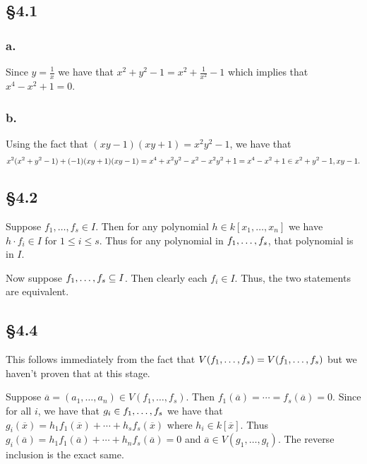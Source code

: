 \documentclass[letterpaper]{article}
\begin{document}
\subsection*{\S 4.1}

\subsubsection*{a.}

Since $y = \frac{1}{x}$ we have that $x^{2} + y^{2} - 1 = x^{2} + \frac{1}{x^{2}} - 1$ which implies that $x^{4} - x^{2} + 1 = 0$.

\subsubsection*{b.}

Using the fact that $(xy - 1)(xy + 1) = x^{2}y^{2} - 1$, we have that
\[
  x^{2}(x^{2} + y^{2} - 1) + (-1)(xy + 1)(xy - 1) = x^{4} + x^{2}y^{2} - x^{2} - x^{2}y^{2} + 1 = x^{4} - x^{2} + 1 \in \ideal{x^{2} + y^{2} - 1, xy - 1}.
\]

\subsection*{\S 4.2}

Suppose $f_{1}, \ldots, f_{s} \in I$. Then for any polynomial $h \in k[x_{1}, \ldots, x_{n}]$ we have $h \cdot f_{i} \in I$ for $1 \leq i \leq s$. Thus for any polynomial in $\gen{ f_{1}, \ldots, f_{s} }$, that polynomial is in $I$.

Now suppose $\gen{ f_{1}, \ldots, f_{s} } \subseteq I$. Then clearly each $f_{i} \in I$.
Thus, the two statements are equivalent.

\subsection*{\S 4.4}

This follows immediately from the fact that $V(f_{1}, \ldots, f_{s}) = V(\ideal{f_{1}, \ldots, f_{s}})$ but we haven't proven that at this stage.

Suppose $\overline{a} = (a_{1}, \ldots, a_{n}) \in V(f_{1}, \ldots, f_{s})$.
Then $f_{1}(\overline{a}) = \cdots = f_{s}(\overline{a}) = 0$.
Since for all $i$, we have that $g_{i} \in \ideal{f_{1}, \ldots, f_{s}}$ we have that $g_{i}(\overline{x}) = h_{1}f_{1}(\overline{x}) + \cdots + h_{s}f_{s}(\overline{x})$ where $h_{i} \in k[\overline{x}]$.
Thus $g_{i}(\overline{a}) = h_{1}f_{1}(\overline{a}) + \cdots + h_{n}f_{s}(\overline{a}) = 0$ and $\overline{a} \in V(g_{1}, \ldots, g_{t})$.
The reverse inclusion is the exact same.
\end{document}
